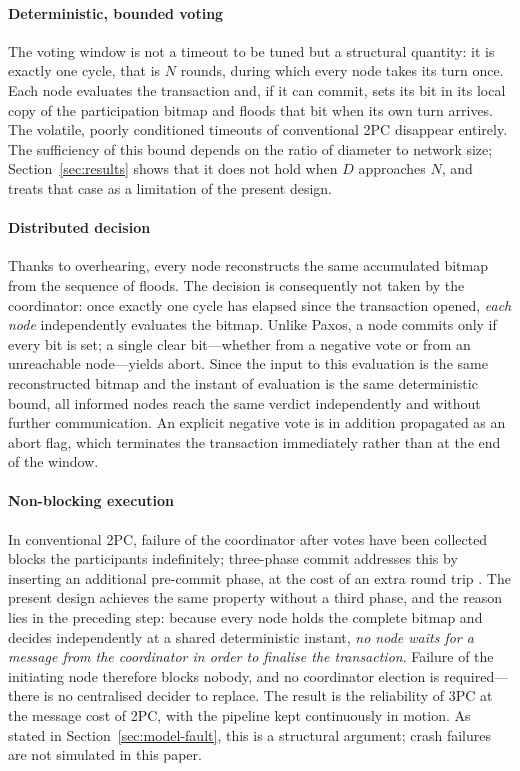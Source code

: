 \documentclass[journal]{IEEEtran}
\newcommand{\Nnodes}{N}                   %
\newcommand{\Diam}{D}                     %
\begin{document}
\paragraph{Deterministic, bounded voting}
The voting window is not a timeout to be tuned but a structural quantity:
it is exactly one cycle, that is $\Nnodes$ rounds, during which every node
takes its turn once. Each node evaluates the transaction and, if it can
commit, sets its bit in its local copy of the participation bitmap and
floods that bit when its own turn arrives. The volatile, poorly
conditioned timeouts of conventional 2PC disappear entirely. The
sufficiency of this bound depends on the ratio of diameter to network
size; Section~\ref{sec:results} shows that it does not hold when $\Diam$
approaches $\Nnodes$, and treats that case as a limitation of the present
design.

\paragraph{Distributed decision}
Thanks to overhearing, every node reconstructs the same accumulated
bitmap from the sequence of floods. The decision is consequently not taken
by the coordinator: once exactly one cycle has elapsed since the
transaction opened, \emph{each node} independently evaluates the bitmap.
Unlike Paxos, a node commits only if
every bit is set; a single clear bit---whether from a negative vote or
from an unreachable node---yields abort. Since the input to this
evaluation is the same reconstructed bitmap and the instant of evaluation is
the same deterministic bound, all informed nodes reach the same verdict
independently and without further communication. An explicit negative vote
is in addition propagated as an abort flag, which terminates the
transaction immediately rather than at the end of the window.

\paragraph{Non-blocking execution}
In conventional 2PC, failure of the coordinator after votes have been
collected blocks the participants indefinitely; three-phase commit
addresses this by inserting an additional pre-commit phase, at the cost of
an extra round trip \cite{skeen81nonblocking}. The present design achieves
the same property without a third phase, and the reason lies in the
preceding step: because every node holds the complete bitmap and decides
independently at a shared deterministic instant, \emph{no node waits for a
message from the coordinator in order to finalise the transaction}.
Failure of the initiating node therefore blocks nobody, and no
coordinator election is required---there is no centralised decider to
replace. The result is the reliability of 3PC at the message cost of 2PC,
with the pipeline kept continuously in motion. As stated in
Section~\ref{sec:model-fault}, this is a structural argument; crash
failures are not simulated in this paper.
\end{document}
